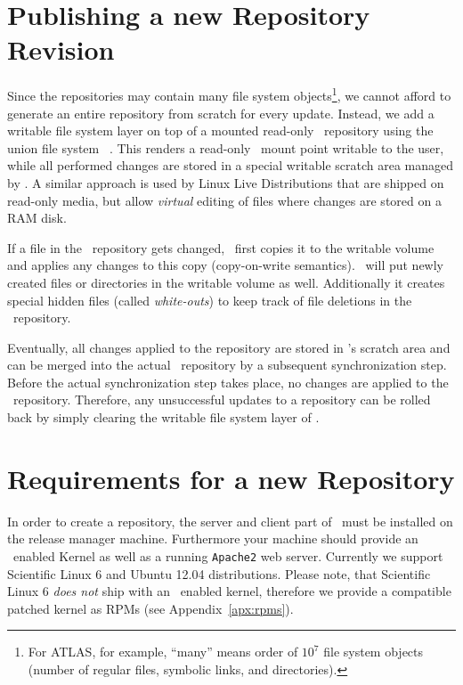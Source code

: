 \section{Publishing a new Repository Revision}
\label{sct:repoupdate}

Since the repositories may contain many file system objects\footnote{For ATLAS, for example, ``many'' means order of $10^7$ file system objects (\ie number of regular files, symbolic links, and directories).}, we cannot afford to generate an entire repository from scratch for every update.
Instead, we add a writable file system layer on top of a mounted read-only \cvmfs\ repository using the union file system \aufs~\cite{aufs}.
This renders a read-only \cvmfs\ mount point writable to the user, while all performed changes are stored in a special writable scratch area managed by \aufs.
A similar approach is used by Linux Live Distributions that are shipped on read-only media, but allow \emph{virtual} editing of files where changes are stored on a RAM disk.

If a file in the \cvmfs\ repository gets changed, \aufs\ first copies it to the writable volume and applies any changes to this copy (copy-on-write semantics).
\aufs\ will put newly created files or directories in the writable volume as well.
Additionally it creates special hidden files (called \emph{white-outs}) to keep track of file deletions in the \cvmfs\ repository.

Eventually, all changes applied to the repository are stored in \aufs's scratch area and can be merged into the actual \cvmfs\ repository by a subsequent synchronization step.
Before the actual synchronization step takes place, no changes are applied to the \cvmfs\ repository.
Therefore, any unsuccessful updates to a repository can be rolled back by simply clearing the writable file system layer of \aufs.

\section{Requirements for a new Repository}
\label{sct:newreporequirements}

In order to create a repository, the server and client part of \cvmfs\ must be installed on the release manager machine.
Furthermore your machine should provide an \aufs\ enabled Kernel as well as a running \texttt{Apache2} web server.
Currently we support Scientific Linux 6 and Ubuntu 12.04 distributions.
Please note, that Scientific Linux 6 \emph{does not} ship with an \aufs\ enabled kernel, therefore we provide a compatible patched kernel as RPMs (see Appendix~\ref{apx:rpms}).


